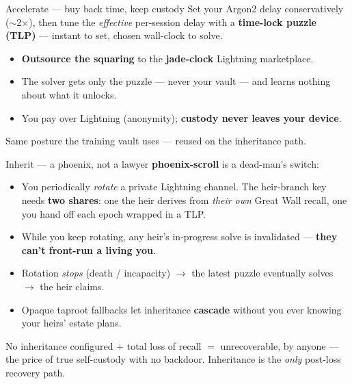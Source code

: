 \documentclass[aspectratio=169,11pt]{beamer}
\begin{document}
\begin{frame}{Accelerate --- buy back time, keep custody}
  Set your Argon2 delay conservatively ($\sim$2$\times$), then tune the
  \emph{effective} per-session delay with a \textbf{time-lock puzzle (TLP)} ---
  instant to set, chosen wall-clock to solve.
  \begin{itemize}\small
    \item \textbf{Outsource the squaring} to the \textbf{jade-clock} Lightning
      marketplace.
    \item The solver gets only the puzzle --- never your vault --- and learns
      nothing about what it unlocks.
    \item You pay over Lightning (anonymity); \textbf{custody never leaves your
      device}.
  \end{itemize}
  \begin{center}\footnotesize\color{graytext}
  Same posture the training vault uses --- reused on the inheritance path.
  \end{center}
\end{frame}

\begin{frame}{Inherit --- a phoenix, not a lawyer}
  \textbf{phoenix-scroll} is a dead-man's switch:
  \begin{itemize}\small
    \item You periodically \emph{rotate} a private Lightning channel. The
      heir-branch key needs \textbf{two shares}: one the heir derives from
      \emph{their own} Great Wall recall, one you hand off each epoch wrapped in a
      TLP.
    \item While you keep rotating, any heir's in-progress solve is invalidated ---
      \textbf{they can't front-run a living you}.
    \item Rotation \emph{stops} (death / incapacity) $\to$ the latest puzzle
      eventually solves $\to$ the heir claims.
    \item Opaque taproot fallbacks let inheritance \textbf{cascade} without you
      ever knowing your heirs' estate plans.
  \end{itemize}
  \begin{pitfall}
    No inheritance configured $+$ total loss of recall $=$ unrecoverable, by
    anyone --- the price of true self-custody with no backdoor. Inheritance is the
    \emph{only} post-loss recovery path.
  \end{pitfall}
\end{frame}
\end{document}
